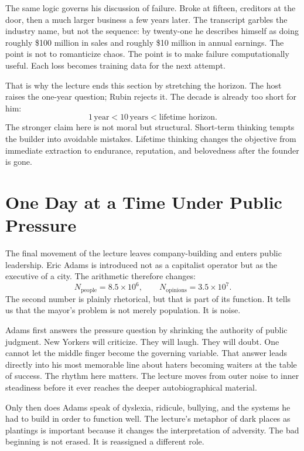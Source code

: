 The same logic governs his discussion of failure. Broke at fifteen, creditors at the door, then a much larger business a few years later. The transcript garbles the industry name, but not the sequence: by twenty-one he describes himself as doing roughly \$100 million in sales and roughly \$10 million in annual earnings. The point is not to romanticize chaos. The point is to make failure computationally useful. Each loss becomes training data for the next attempt.

That is why the lecture ends this section by stretching the horizon. The host raises the one-year question; Rubin rejects it. The decade is already too short for him:
\begin{equation}
1\,\mathrm{year}<10\,\mathrm{years}<\text{lifetime horizon}.
\end{equation}
The stronger claim here is not moral but structural. Short-term thinking tempts the builder into avoidable mistakes. Lifetime thinking changes the objective from immediate extraction to endurance, reputation, and belovedness after the founder is gone.

\section{One Day at a Time Under Public Pressure}

The final movement of the lecture leaves company-building and enters public leadership. Eric Adams is introduced not as a capitalist operator but as the executive of a city. The arithmetic therefore changes:
\begin{equation}
N_{\mathrm{people}}=8.5\times 10^6,\qquad
N_{\mathrm{opinions}}=3.5\times 10^7.
\end{equation}
The second number is plainly rhetorical, but that is part of its function. It tells us that the mayor's problem is not merely population. It is noise.

Adams first answers the pressure question by shrinking the authority of public judgment. New Yorkers will criticize. They will laugh. They will doubt. One cannot let the middle finger become the governing variable. That answer leads directly into his most memorable line about haters becoming waiters at the table of success. The rhythm here matters. The lecture moves from outer noise to inner steadiness before it ever reaches the deeper autobiographical material.

Only then does Adams speak of dyslexia, ridicule, bullying, and the systems he had to build in order to function well. The lecture's metaphor of dark places as plantings is important because it changes the interpretation of adversity. The bad beginning is not erased. It is reassigned a different role.

